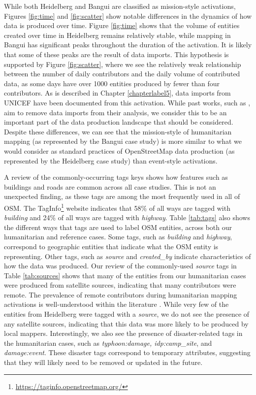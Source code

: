 While both Heidelberg and Bangui are classified as mission-style activations, Figures \ref{fig:time} and \ref{fig:scatter} show notable differences in the dynamics of how data is produced over time. Figure \ref{fig:time} shows that the volume of entities created over time in Heidelberg remains relatively stable, while mapping in Bangui has significant peaks throughout the duration of the activation. It is likely that some of these peaks are the result of data imports. This hypothesis is supported by Figure \ref{fig:scatter}, where we see the relatively weak relationship between the number of daily contributors and the daily volume of contributed data, as some days have over 1000 entities produced by fewer than four contributors. As is described in Chapter \ref{chapterlabel5}, data imports from UNICEF have been documented from this activation. While past works, such as \textcite{ahmouda_analyzing_2018}, aim to remove data imports from their analysis, we consider this to be an important part of the data production landscape that should be considered. Despite these differences, we can see that the mission-style of humanitarian mapping (as represented by the Bangui case study) is more similar to what we would consider as standard practices of OpenStreetMap data production (as represented by the Heidelberg case study) than event-style activations.

A review of the commonly-occurring tags keys shows how features such as buildings and roads are common across all case studies. This is not an unexpected finding, as these tags are among the most frequently used in all of OSM. The TagInfo\footnote{\url{https://taginfo.openstreetmap.org/}} website indicates that 58\% of all ways are tagged with \textit{building} and 24\% of all ways are tagged with \textit{highway}. Table \ref{tab:tags} also shows the different ways that tags are used to label OSM entities, across both our humanitarian and reference cases. Some tags, such as \textit{building} and \textit{highway}, correspond to geographic entities that indicate what the OSM entity is representing. Other tags, such as \textit{source} and \textit{created_by} indicate characteristics of how the data was produced. Our review of the commonly-used \textit{source} tags in Table \ref{tab:sources} shows that many of the entities from our humanitarian cases were produced from satellite sources, indicating that many contributors were remote. The prevalence of remote contributors during humanitarian mapping activations is well-understood within the literature \parencite{dittus_mass_2017, eckle_quality_2015}. While very few of the entities from Heidelberg were tagged with a \textit{source}, we do not see the presence of any satellite sources, indicating that this data was more likely to be produced by local mappers. Interestingly, we also see the presence of disaster-related tags in the humanitarian cases, such as \textit{typhoon:damage, idp:camp_site}, and \textit{damage:event}. These disaster tags correspond to temporary attributes, suggesting that they will likely need to be removed or updated in the future. \\

